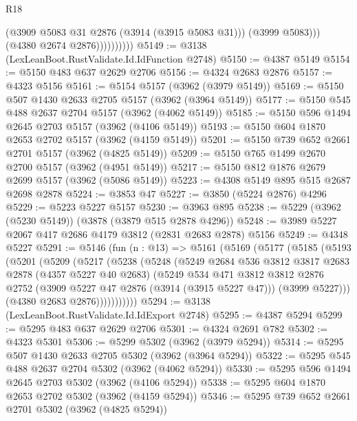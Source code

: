 \begin{lexlean}{R18}
\begin{coremodule}
                          (@3909 @5083 @31 @2876 (@3914 (@3915 @5083 @31)))
                          (@3999 @5083)))
                      (@4380 @2674 @2876))))))))))
@5149 := @3138 (LexLeanBoot.RustValidate.Id.IdFunction @2748)
@5150 := @4387 @5149
@5154 := @5150 @483 @637 @2629 @2706
@5156 := @4324 @2683 @2876
@5157 := @4323 @5156
@5161 := @5154 @5157 (@3962 (@3979 @5149))
@5169 := @5150 @507 @1430 @2633 @2705 @5157 (@3962 (@3964 @5149))
@5177 := @5150 @545 @488 @2637 @2704 @5157 (@3962 (@4062 @5149))
@5185 := @5150 @596 @1494 @2645 @2703 @5157 (@3962 (@4106 @5149))
@5193 := @5150 @604 @1870 @2653 @2702 @5157 (@3962 (@4159 @5149))
@5201 := @5150 @739 @652 @2661 @2701 @5157 (@3962 (@4825 @5149))
@5209 := @5150 @765 @1499 @2670 @2700 @5157 (@3962 (@4951 @5149))
@5217 := @5150 @812 @1876 @2679 @2699 @5157 (@3962 (@5086 @5149))
@5223 := @4308 @5149 @895 @515 @2687 @2698 @2878
@5224 := @3853 @47
@5227 := @3850 (@5224 @2876) @4296
@5229 := @5223 @5227 @5157
@5230 := @3963 @895
@5238 := @5229 (@3962 (@5230 @5149)) (@3878 (@3879 @515 @2878 @4296))
@5248 := @3989 @5227 @2067 @417 @2686 @4179 @3812 (@2831 @2683 @2878) @5156
@5249 := @4348 @5227
@5291 := @5146
    (fun (n : @13) =>
    @5161
      (@5169
        (@5177
          (@5185
            (@5193
              (@5201
                (@5209
                  (@5217
                    (@5238
                      (@5248
                        (@5249
                          @2684
                          @536
                          @3812
                          @3817
                          @2683
                          @2878
                          (@4357 @5227 @40 @2683)
                          (@5249
                            @534
                            @471
                            @3812
                            @3812
                            @2876
                            @2752
                            (@3909 @5227 @47 @2876 (@3914 (@3915 @5227 @47)))
                            (@3999 @5227)))
                        (@4380 @2683 @2876)))))))))))
@5294 := @3138 (LexLeanBoot.RustValidate.Id.IdExport @2748)
@5295 := @4387 @5294
@5299 := @5295 @483 @637 @2629 @2706
@5301 := @4324 @2691 @782
@5302 := @4323 @5301
@5306 := @5299 @5302 (@3962 (@3979 @5294))
@5314 := @5295 @507 @1430 @2633 @2705 @5302 (@3962 (@3964 @5294))
@5322 := @5295 @545 @488 @2637 @2704 @5302 (@3962 (@4062 @5294))
@5330 := @5295 @596 @1494 @2645 @2703 @5302 (@3962 (@4106 @5294))
@5338 := @5295 @604 @1870 @2653 @2702 @5302 (@3962 (@4159 @5294))
@5346 := @5295 @739 @652 @2661 @2701 @5302 (@3962 (@4825 @5294))

\end{coremodule}
\end{lexlean}
